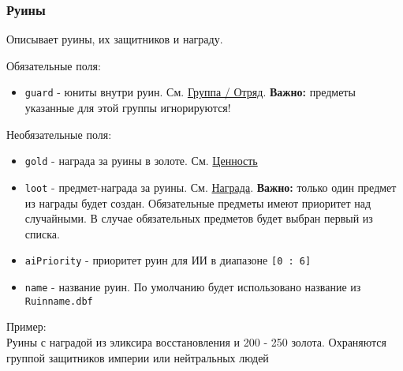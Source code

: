 \subsubsection{Руины}
\label{ruin}
Описывает руины, их защитников и награду.

Обязательные поля:
\begin{itemize}
\item \texttt{guard} - юниты внутри руин. См. \hyperref[group]{Группа / Отряд}. \textbf{Важно:} предметы указанные для этой группы игнорируются!
\end{itemize}

Необязательные поля:
\begin{itemize}
\item \texttt{gold} - награда за руины в золоте. См. \hyperref[value]{Ценность}
\item \texttt{loot} - предмет-награда за руины. См. \hyperref[loot]{Награда}. \textbf{Важно:} только один предмет из награды будет создан. Обязательные предметы имеют приоритет над случайными. В случае обязательных предметов будет выбран первый из списка.
\item \texttt{aiPriority} - приоритет руин для ИИ в диапазоне \texttt{[0 : 6]}
\item \texttt{name} - название руин. По умолчанию будет использовано название из \texttt{Ruinname.dbf}
\end{itemize}

Пример:\\
Руины с наградой из эликсира восстановления и 200 - 250 золота.
Охраняются группой защитников империи или нейтральных людей

\begin{figure}[H]

\end{figure}